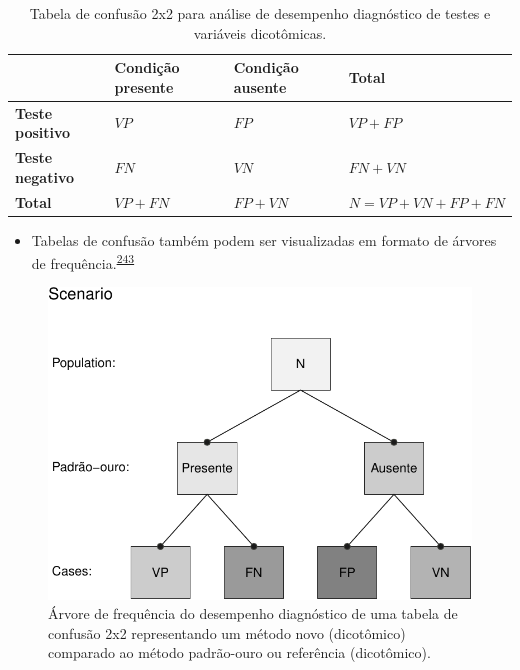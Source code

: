 \documentclass[
  a4paper,
]{book}
\providecommand{\tightlist}{%
  \setlength{\itemsep}{0pt}\setlength{\parskip}{0pt}}
\begin{document}
\begin{table}

\caption{\label{tab:crosstable}Tabela de confusão 2x2 para análise de desempenho diagnóstico de testes e variáveis dicotômicas.}
\centering
\begin{tabu} to 
\toprule
\textbf{ } & \textbf{Condição presente} & \textbf{Condição ausente} & \textbf{Total}\\
\midrule
\textbf{Teste positivo} & $VP$ & $FP$ & $VP+FP$\\
\textbf{Teste negativo} & $FN$ & $VN$ & $FN+VN$\\
\textbf{Total} & $VP+FN$ & $FP+VN$ & $N=VP+VN+FP+FN$\\
\bottomrule
\end{tabu}
\end{table}

\begin{itemize}
\tightlist
\item
  Tabelas de confusão também podem ser visualizadas em formato de árvores de frequência.\textsuperscript{\protect\hyperlink{ref-steckelberg2004}{243}}
\end{itemize}

\begin{figure}

{\centering \includegraphics{Ciencia-com-R_files/figure-latex/frequency-tree-1} 

}

\caption{Árvore de frequência do desempenho diagnóstico de uma tabela de confusão 2x2 representando um método novo (dicotômico) comparado ao método padrão-ouro ou referência (dicotômico).}\label{fig:frequency-tree}
\end{figure}
\end{document}
